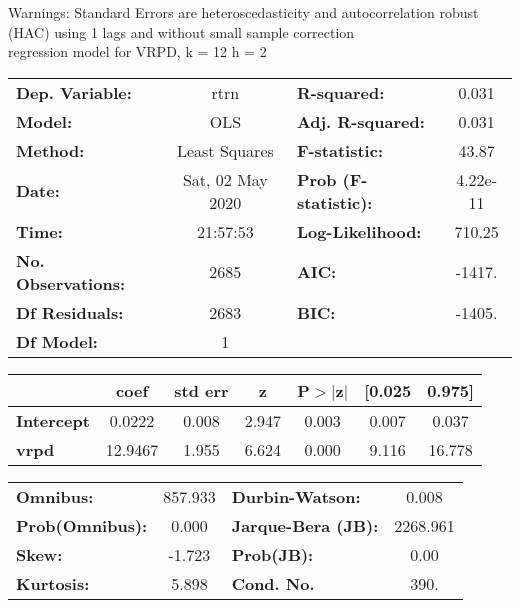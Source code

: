 Warnings: \newline
 [1] Standard Errors are heteroscedasticity and autocorrelation robust (HAC) using 1 lags and without small sample correction\\ 

regression model for VRPD, k = 12 h = 2\begin{center}
\begin{tabular}{lclc}
\toprule
\textbf{Dep. Variable:}    &       rtrn       & \textbf{  R-squared:         } &     0.031   \\
\textbf{Model:}            &       OLS        & \textbf{  Adj. R-squared:    } &     0.031   \\
\textbf{Method:}           &  Least Squares   & \textbf{  F-statistic:       } &     43.87   \\
\textbf{Date:}             & Sat, 02 May 2020 & \textbf{  Prob (F-statistic):} &  4.22e-11   \\
\textbf{Time:}             &     21:57:53     & \textbf{  Log-Likelihood:    } &    710.25   \\
\textbf{No. Observations:} &        2685      & \textbf{  AIC:               } &    -1417.   \\
\textbf{Df Residuals:}     &        2683      & \textbf{  BIC:               } &    -1405.   \\
\textbf{Df Model:}         &           1      & \textbf{                     } &             \\
\bottomrule
\end{tabular}
\begin{tabular}{lcccccc}
                   & \textbf{coef} & \textbf{std err} & \textbf{z} & \textbf{P$> |$z$|$} & \textbf{[0.025} & \textbf{0.975]}  \\
\midrule
\textbf{Intercept} &       0.0222  &        0.008     &     2.947  &         0.003        &        0.007    &        0.037     \\
\textbf{vrpd}      &      12.9467  &        1.955     &     6.624  &         0.000        &        9.116    &       16.778     \\
\bottomrule
\end{tabular}
\begin{tabular}{lclc}
\textbf{Omnibus:}       & 857.933 & \textbf{  Durbin-Watson:     } &    0.008  \\
\textbf{Prob(Omnibus):} &   0.000 & \textbf{  Jarque-Bera (JB):  } & 2268.961  \\
\textbf{Skew:}          &  -1.723 & \textbf{  Prob(JB):          } &     0.00  \\
\textbf{Kurtosis:}      &   5.898 & \textbf{  Cond. No.          } &     390.  \\
\bottomrule
\end{tabular}
\end{center}

